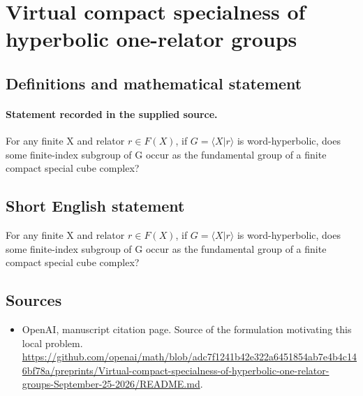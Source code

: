 \documentclass[11pt]{article}
\begin{document}
\section*{Virtual compact specialness of hyperbolic one-relator groups}\label{30007195}
\subsection{Definitions and mathematical statement}
\paragraph{Statement recorded in the supplied source.}
For any finite X and relator $r\in F(X)$, if $G=\langle X|r\rangle $ is word-hyperbolic, does some finite-index subgroup of G occur as the fundamental group of a finite compact special cube complex?
\subsection{Short English statement}
For any finite X and relator $r\in F(X)$, if $G=\langle X|r\rangle $ is word-hyperbolic, does some finite-index subgroup of G occur as the fundamental group of a finite compact special cube complex?
\subsection{Sources}
\begin{itemize}
\item[S1] OpenAI, manuscript citation page. Source of the formulation motivating this local problem.
\url{https://github.com/openai/math/blob/adc7f1241b42e322a6451854ab7e4b4c146bf78a/preprints/Virtual-compact-specialness-of-hyperbolic-one-relator-groups-September-25-2026/README.md}.
\end{itemize}
\end{document}
